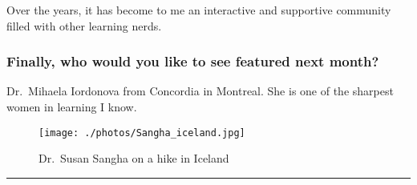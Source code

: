 \documentclass[]{article}
\begin{document}
Over the years, it has become to me an interactive and supportive
community filled with other learning nerds.

\subsubsection{\texorpdfstring{\textbf{Finally, who would you like to
see featured next
month?}}{Finally, who would you like to see featured next month?}}\label{finally-who-would-you-like-to-see-featured-next-month}

Dr.~Mihaela Iordonova from Concordia in Montreal. She is one of the
sharpest women in learning I know.

\begin{figure}
\centering
\texttt{[image: ./photos/Sangha\_iceland.jpg]}
\caption{Dr.~Susan Sangha on a hike in Iceland}
\end{figure}

\begin{center}\rule{0.5\linewidth}{\linethickness}\end{center}
\end{document}
